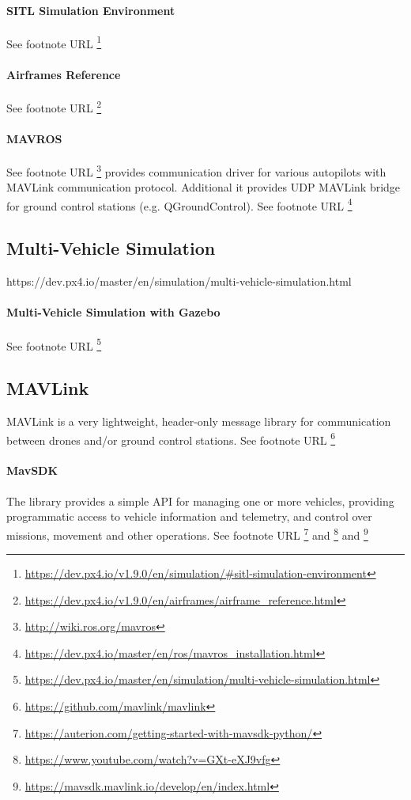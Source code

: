\documentclass{article}
\begin{document}
			\paragraph{SITL Simulation Environment}
			See footnote URL \footnote{\url{https://dev.px4.io/v1.9.0/en/simulation/#sitl-simulation-environment}}
			\paragraph{Airframes Reference}
			See footnote URL \footnote{\url{https://dev.px4.io/v1.9.0/en/airframes/airframe_reference.html}}
			\paragraph{MAVROS}
			See footnote URL \footnote{\url{http://wiki.ros.org/mavros}}
			provides communication driver for various autopilots with MAVLink communication protocol. Additional it provides UDP MAVLink bridge for ground control stations (e.g. QGroundControl).
			See footnote URL \footnote{\url{https://dev.px4.io/master/en/ros/mavros_installation.html}}
			
			\subsection{Multi-Vehicle Simulation}
			https://dev.px4.io/master/en/simulation/multi-vehicle-simulation.html
			\paragraph{Multi-Vehicle Simulation with Gazebo}
			See footnote URL \footnote{\url{https://dev.px4.io/master/en/simulation/multi-vehicle-simulation.html}}
			\subsection{MAVLink}
			MAVLink is a very lightweight, header-only message library for communication between drones and/or ground control stations. See footnote URL \footnote{\url{https://github.com/mavlink/mavlink}}
			\paragraph{MavSDK}
			The library provides a simple API for managing one or more vehicles, providing programmatic access to vehicle information and telemetry, and control over missions, movement and other operations.
			See footnote URL \footnote{\url{https://auterion.com/getting-started-with-mavsdk-python/}} and  \footnote{\url{https://www.youtube.com/watch?v=GXt-eXJ9vfg}} and \footnote{\url{https://mavsdk.mavlink.io/develop/en/index.html}}
\end{document}
